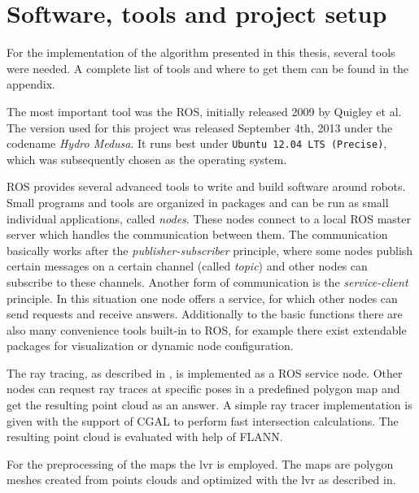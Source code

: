 \documentclass[Thesis.tex]{subfiles}
\begin{document}
\chapter{Software, tools and project setup}
For the implementation of the algorithm presented in this thesis, several tools were needed. A complete list of tools and where to get them can be found in the appendix.

\smallskip

The most important tool was the \gls{ROS}, initially released 2009 by Quigley et al.\cite{ros:2009} The version used for this project was released September 4th, 2013 under the codename \emph{Hydro Medusa}. It runs best under \texttt{Ubuntu 12.04 LTS (Precise)}, which was subsequently chosen as the operating system. 

\gls{ROS} provides several advanced tools to write and build software around robots. Small programs and tools are organized in packages and can be run as small individual applications, called \emph{nodes}. These nodes connect to a local \gls{ROS} master server which handles the communication between them. The communication basically works after the \emph{publisher-subscriber} principle, where some nodes publish certain messages on a certain channel (called \emph{topic}) and other nodes can subscribe to these channels.
Another form of communication is the \emph{service-client} principle. In this situation one node offers a service, for which other nodes can send requests and receive answers. Additionally to the basic functions there are also many convenience tools built-in to \gls{ROS}, for example there exist extendable packages for visualization or dynamic node configuration.

\smallskip

The ray tracing, as described in , is implemented as a \gls{ROS} service node. Other nodes can request ray traces at specific poses in a predefined polygon map and get the resulting point cloud as an answer. A simple ray tracer implementation is given with the support of \gls{CGAL} to perform fast intersection calculations. The resulting point cloud is evaluated with help of \gls{FLANN}. 

For the preprocessing of the maps the \gls{lvr} is employed. The maps are polygon meshes created from points clouds and optimized with the \gls{lvr} as described in\cite{Wiemann:2013}.
\end{document}

